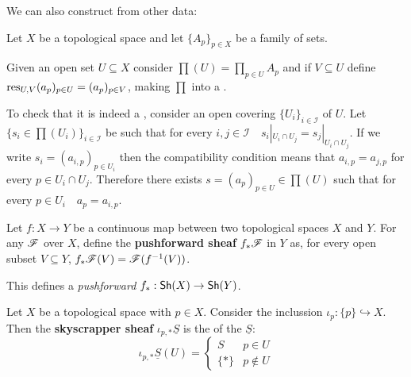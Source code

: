 \documentclass[../main.tex]{subfiles}
\begin{document}
We can also construct  from other data:
\begin{example} \label{ex:set-product-sheaf}
  Let \(X\) be a topological space and let \(\{A_{p}\}_{p \in X}\) be a family of sets.

  Given an open set \(U \subseteq X\) consider \(\prod(U) = \prod_{p \in U} A_{p}\) and if \(V \subseteq U\) define \(\operatorname{res}_{U, V} (a_{p})_{p \in U} = (a_{p})_{p \in V}\), making \(\prod\) into a .

  To check that it is indeed a , consider an open covering \(\{U_{i}\}_{i \in \mathcal{I}}\) of \(U\).
  Let \(\{s_{i} \in \prod(U_{i})\}_{i \in \mathcal{I}}\) be such that for every \(i, j \in \mathcal{I} \quad s_{i}|_{U_{i} \cap U_{j}} = s_{j}|_{U_{i} \cap U_{j}}\).
  If we write \(s_{i} = (a_{i, p})_{p \in U_{i}}\) then the compatibility condition means that \(a_{i, p} = a_{j, p}\) for every \(p \in U_{i} \cap U_{j}\).
  Therefore there exists \(s = (a_{p})_{p \in U} \in \prod(U)\) such that for every \(p \in U_{i} \quad a_{p} = a_{i, p}\).
\end{example}

\begin{definition} \label{def:pushforward-sheaf}
  Let \(f: X \to Y\) be a continuous map between two topological spaces \(X\) and \(Y\).
  For any  \(\mathscr{F}\) over \(X\), define the \textbf{pushforward sheaf} \(f_{\ast}\mathscr{F}\) in \(Y\) as, for every open subset \(V \subseteq Y\), \(f_{\ast}\mathscr{F}(V) = \mathscr{F}(f^{-1}(V))\).

  This defines a \textit{pushforward } \(f_{\ast}: \mathsf{Sh}(X) \to \mathsf{Sh}(Y)\).
\end{definition}

\begin{example} \label{ex:skyscrapper-sheaf}
  Let \(X\) be a topological space with \(p \in X\).
  Consider the inclussion \(\iota_{p}: \{p\} \hookrightarrow X\).
  Then the \textbf{skyscrapper sheaf} \(\iota_{p, \ast} \underline{S}\) is the  of the  \(\underline{S}\):
  \begin{equation*}
    \iota_{p, \ast}\underline{S}(U) = \begin{cases}
      S & p \in U \\
      \{\ast\} & p \notin U
    \end{cases}
  \end{equation*}
\end{example}
\end{document}
